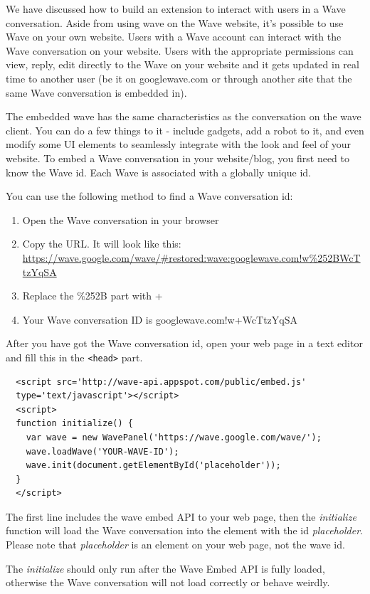 We have discussed how to build an extension to interact with users in a
Wave conversation. Aside from using wave on the Wave website, it's
possible to use Wave on your own website. Users with a Wave account
can interact with the Wave conversation on your website. Users with the
appropriate permissions can view, reply, edit directly to the Wave on
your website and it gets updated in real time to another user (be it
on googlewave.com or through another site that the same Wave
conversation is embedded in).

The embedded wave has the same characteristics as the conversation on
the wave client. You can do a few things to it - include gadgets, add
a robot to it, and even modify some UI elements to seamlessly
integrate with the look and feel of your website.
To embed a Wave conversation in your website/blog, you first need to know 
the Wave id. Each Wave is associated with a globally unique id. 

You can use the following method to find a Wave conversation id:
\begin{enumerate}
\item Open the Wave conversation in your browser
\item Copy the URL. It will look like this: \url{https://wave.google.com/wave/#restored:wave:googlewave.com!w%252BWcTtzYqSA}
\item Replace the \%252B part with +
\item Your Wave conversation ID is googlewave.com!w+WcTtzYqSA
\end{enumerate}

After you have got the Wave conversation id, open your web page in a
text editor and fill this in the {\tt <head>} part.

\begin{verbatim}
  <script src='http://wave-api.appspot.com/public/embed.js' 
  type='text/javascript'></script>
  <script>
  function initialize() {
    var wave = new WavePanel('https://wave.google.com/wave/');
    wave.loadWave('YOUR-WAVE-ID');
    wave.init(document.getElementById('placeholder'));
  }
  </script>
\end{verbatim}

The first line includes the wave embed API to your web page, then
 the \emph{initialize} function will load the Wave conversation into
 the element with the id \emph{placeholder}. Please note
 that \emph{placeholder} is an element on your web page, not the wave
 id.

The \emph{initialize} should only run after the Wave Embed API is
fully loaded, otherwise the Wave conversation will not load correctly
or behave weirdly.

